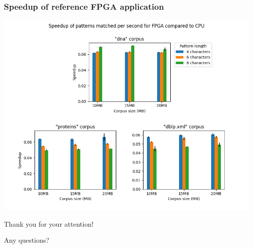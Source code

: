 \documentclass[aspectratio=1610]{uva-inf-presentation}
\begin{document}
\begin{frame}
  \frametitle{Speedup of reference FPGA application}
  \centering
  \includegraphics[width=0.67\linewidth]{speedup_fpga}
\end{frame}

\begin{frame}
  \centering
  Thank you for your attention!

  Any questions?
\end{frame}
\end{document}
